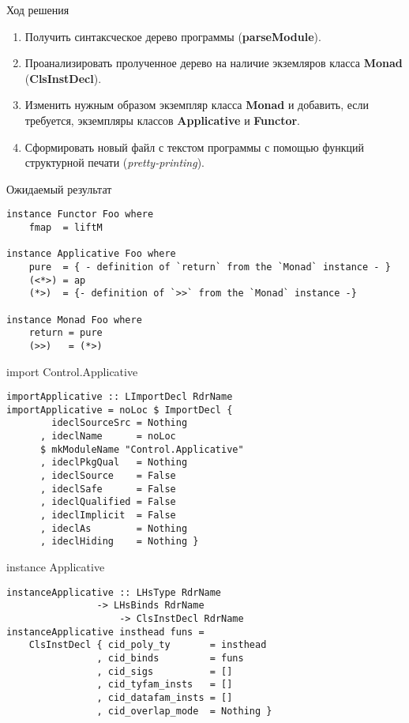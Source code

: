 \documentclass [12 pt ] {beamer}
\begin{document}
    \begin{frame}{Ход решения}
        \begin{enumerate}
            \item Получить синтаксческое дерево программы 
                (\textbf{parseModule}).
            \item Проанализировать пролученное дерево на наличие 
                экземляров класса \textbf{Monad} (\textbf{ClsInstDecl}).
            \item Изменить нужным образом экземпляр класса \textbf{Monad}
                и добавить, если требуется, экземпляры классов 
                \textbf{Applicative} и \textbf{Functor}.
            \item Сформировать новый файл с текстом программы
                с помощью функций структурной печати 
                (\textit{pretty-printing}).
        \end{enumerate}
    \end{frame}
    
    \begin{frame}[containsverbatim]{Ожидаемый результат}
        \begin{lstlisting}
instance Functor Foo where
    fmap  = liftM

instance Applicative Foo where
    pure  = { - definition of `return` from the `Monad` instance - }
    (<*>) = ap
    (*>)  = {- definition of `>>` from the `Monad` instance -}

instance Monad Foo where
    return = pure
    (>>)   = (*>)
        \end{lstlisting}
    \end{frame}
    
    \begin {frame}[containsverbatim]{import Control.Applicative}
        \begin{lstlisting}
importApplicative :: LImportDecl RdrName
importApplicative = noLoc $ ImportDecl { 
        ideclSourceSrc = Nothing
      , ideclName      = noLoc 
      $ mkModuleName "Control.Applicative"
      , ideclPkgQual   = Nothing
      , ideclSource    = False
      , ideclSafe      = False
      , ideclQualified = False
      , ideclImplicit  = False
      , ideclAs        = Nothing
      , ideclHiding    = Nothing } 
        \end{lstlisting}
    \end {frame}
    
    \begin {frame}[containsverbatim]{instance Applicative}
        \begin{lstlisting}
instanceApplicative :: LHsType RdrName 
                -> LHsBinds RdrName
                    -> ClsInstDecl RdrName
instanceApplicative insthead funs = 
    ClsInstDecl { cid_poly_ty       = insthead
                , cid_binds         = funs
                , cid_sigs          = []
                , cid_tyfam_insts   = []
                , cid_datafam_insts = []
                , cid_overlap_mode  = Nothing }
        \end{lstlisting}
    \end {frame}
    
\end{document}
